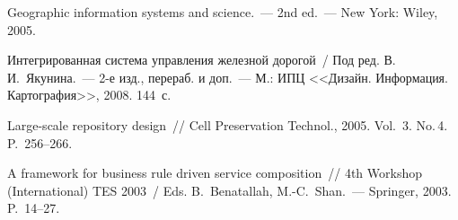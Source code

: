 \begin{multicols}{2}
{{\begin{thebibliography}{9}
Geographic information systems and science.~--- 2nd ed.~--- New York: Wiley, 2005.

Интегрированная система управления железной дорогой~/ Под ред. В.\,И.~Якунина.~--- 
2-е изд., перераб. и доп.~--- М.: ИПЦ <<Дизайн. Информация. Картография>>, 2008. 
144~с.

Large-scale repository design~// Cell Preservation Technol., 2005. Vol.~3. No.\,4. P.~256--266.


\label{end\stat}

A framework for business rule driven service composition~// 4th  Workshop (International) TES 
2003~/ Eds. B.~Benatallah, M.-C.~Shan.~--- Springer, 2003. P.~14--27.
 \end{thebibliography}
}
}


\end{multicols}